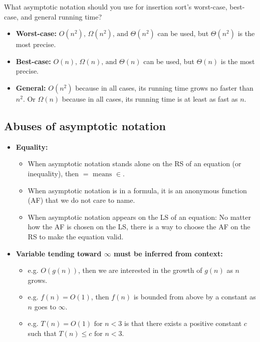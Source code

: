     \begin{example}
        What asymptotic notation should you use for insertion sort's worst-case, best-case, and general running time? 
        \vspace{1em}

        \begin{itemize}
            \item \textbf{Worst-case:} $O(n^2)\text{, } \Omega(n^2)\text{, and } \Theta(n^2)$ can be used, but $\Theta(n^2)$ is the most precise. 
            \item \textbf{Best-case:} $O(n)\text{, } \Omega(n)\text{, and } \Theta(n)$ can be used, but $\Theta(n)$ is the most precise. 
            \item \textbf{General:} $O(n^2)$ because in all cases, its running time grows no faster than $n^2$. Or $\Omega(n)$ because in all cases, its running time is at least as fast as $n$.
        \end{itemize}
    \end{example}

\subsection{Abuses of asymptotic notation}
    \begin{intuition}
        \begin{itemize}
            \item \textbf{Equality:}
            \begin{itemize}
                \item When asymptotic notation stands alone on the RS of an equation (or inequality), then $= \text{ means } \in$.
                \item When asymptotic notation is in a formula, it is an anonymous function (AF) that we do not care to name.
                \item When asymptotic notation appears on the LS of an equation: No matter how the AF is chosen on the LS, there is a way to choose the AF on the RS to make the equation valid.
            \end{itemize}
            \item \textbf{Variable tending toward $\infty$ must be inferred from context:}
            \begin{itemize}
                \item e.g. $O(g(n))$, then we are interested in the growth of $g(n)$ as $n$ grows.
                \item e.g. $f(n) = O(1)$, then $f(n)$ is bounded from above by a constant as $n$ goes to $\infty$.
                \item e.g. $T(n) = O(1) \text{ for } n<3$ is that there exists a positive constant $c$ such that $T(n) \leq c \text{ for } n<3$.
            \end{itemize}
        \end{itemize}
    \end{intuition}

